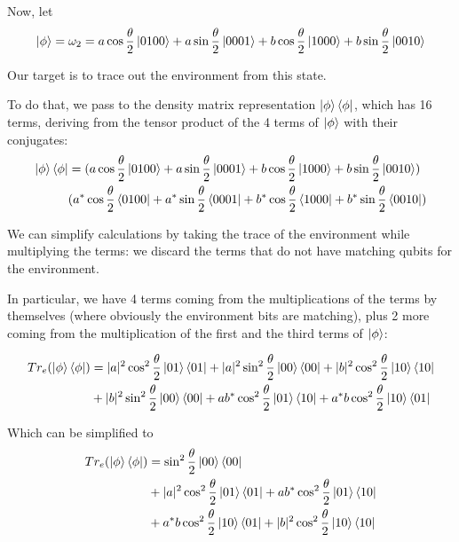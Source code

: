\documentclass{masterthesis}
\begin{document}
Now, let
\begin{equation}
    \ket{\phi} = \omega_2 = a\cos\frac{\theta}{2}\ket{0100} + a\sin\frac{\theta}{2}\ket{0001} + b\cos\frac{\theta}{2}\ket{1000} + b\sin\frac{\theta}{2}\ket{0010}
\end{equation}

Our target is to trace out the environment from this state.

To do that, we pass to the density matrix representation $\ket{\phi}\bra{\phi}$, which has 16 terms, deriving from the tensor product of the 4 terms of $\ket{\phi}$ with their conjugates:
\begin{align}
    \ket{\phi}\bra{\phi} &= (a\cos\frac{\theta}{2}\ket{0100} + a\sin\frac{\theta}{2}\ket{0001} + b\cos\frac{\theta}{2}\ket{1000} + b\sin\frac{\theta}{2}\ket{0010}) \nonumber \\
    &(a^{*}\cos\frac{\theta}{2}\bra{0100} + a^{*}\sin\frac{\theta}{2}\bra{0001} + b^{*}\cos\frac{\theta}{2}\bra{1000} + b^{*}\sin\frac{\theta}{2}\bra{0010})
\end{align}

We can simplify calculations by taking the trace of the environment while multiplying the terms: we discard the terms that do not have matching qubits for the environment.

In particular, we have 4 terms coming from the multiplications of the terms by themselves (where obviously the environment bits are matching), plus 2 more coming from the multiplication of the first and the third terms of $\ket{\phi}$:

\begin{align}
    Tr_e(\ket{\phi}\bra{\phi}) &= |a|^2 \cos^2 \frac{\theta}{2}\ket{01}\bra{01} + |a|^2 \sin^2 \frac{\theta}{2}\ket{00}\bra{00} + |b|^2 \cos^2 \frac{\theta}{2}\ket{10}\bra{10} \\
    & + |b|^2 \sin^2 \frac{\theta}{2}\ket{00}\bra{00} + a b^{*} \cos^2 \frac{\theta}{2} \ket{01}\bra{10} + a^{*} b \cos^2 \frac{\theta}{2} \ket{10}\bra{01} 
\end{align}

Which can be simplified to 
\begin{align}
    Tr_e(\ket{\phi}\bra{\phi}) &= \sin^2 \frac{\theta}{2}\ket{00}\bra{00} \\ 
    & + |a|^2 \cos^2 \frac{\theta}{2}\ket{01}\bra{01} + a b^{*} \cos^2 \frac{\theta}{2} \ket{01}\bra{10} \\
    & + a^{*} b \cos^2 \frac{\theta}{2} \ket{10}\bra{01} + |b|^2 \cos^2 \frac{\theta}{2}\ket{10}\bra{10}
\end{align}
\end{document}
